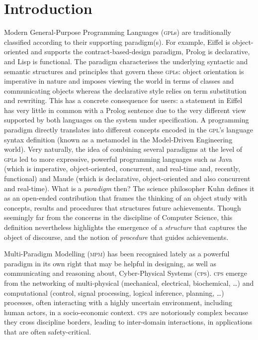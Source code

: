 \section{Introduction}
\label{sec:Introduction}

Modern General-Purpose Programming Languages (\textsc{gpl}s) are traditionally
classified according to their supporting paradigm(s).
For example, Eiffel is object-oriented and supports the contract-based-design
paradigm, Prolog is declarative, and Lisp is functional. The paradigm
characterises the underlying syntactic and semantic structures and principles
that govern these \textsc{gpl}s: object orientation is imperative in nature and
imposes viewing the world in terms of classes and communicating objects whereas the
declarative style relies on term substitution and rewriting.
This has a concrete consequence for users: a statement in Eiffel has very little
in common with a Prolog sentence due to the very different view supported by
both languages on the system under specification.
A programming paradigm directly translates into different concepts encoded in
the \textsc{gpl}'s language syntax definition (known as a metamodel in the
Model-Driven Engineering world).
Very naturally, the idea of combining several paradigms at the level of
\textsc{gpl}s led to more expressive, powerful programming languages such as
Java (which is imperative, object-oriented, concurrent, and real-time and,
recently, functional) and Maude (which is declarative, object-oriented and also
concurrent and real-time).
What is a \emph{paradigm} then? The science philosopher Kuhn \cite{B:Kuhn:2012}
defines it as an
open-ended contribution that frames the thinking of an object study with
concepts, results and procedures that structures future achievements. Though
seemingly far from the concerns in the discipline of Computer Science, this
definition nevertheless highlights the emergence of a \emph{structure} that
captures the object of discourse, and the notion of \emph{procedure} that guides
achievements.

Multi-Paradigm Modelling (\textsc{mpm}) has been recognised lately as a powerful
paradigm in its own right that may be helpful in designing, as well as
communicating and reasoning about, Cyber-Physical Systems (\textsc{cps}).
\textsc{cps} emerge from the networking of multi-physical  (mechanical,
electrical, biochemical, \ldots) and computational (control, signal processing,
logical inference, planning, \ldots) processes, often interacting with a highly
uncertain environment, including human actors, in a socio-economic context.
\textsc{cps} are notoriously complex because they cross discipline borders,
leading to inter-domain interactions, in applications that are often
safety-critical.

